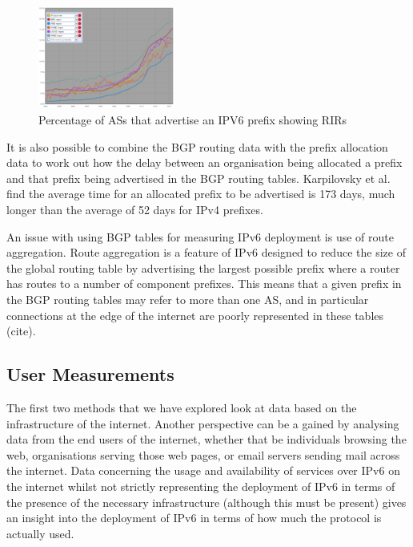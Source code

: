 \begin{figure}[htb]
\centering
\includegraphics[width=0.4\textwidth]{img/v6-bgp-rirs.png}
\caption{Percentage of ASs that advertise an IPV6 prefix showing RIRs}
\label{fig:bgp-rirs}
\end{figure}

It is also possible to combine the BGP routing data with the prefix allocation
data to work out how the delay between an organisation being allocated a prefix
and that prefix being advertised in the BGP routing tables. Karpilovsky et al.
find the average time for an allocated prefix to be advertised is 173 days, much
longer than the average of 52 days for IPv4 prefixes.

An issue with using BGP tables for measuring IPv6 deployment is use of route
aggregation. Route aggregation is a feature of IPv6 designed to reduce the size of the
global routing table by advertising the largest possible prefix where a router
has routes to a number of component prefixes. This means that a given prefix in
the BGP routing tables may refer to more than one AS, and in particular
connections at the edge of the internet are poorly represented in these
tables (cite).


\subsection{User Measurements}

The first two methods that we have explored look at data based on the
infrastructure of the internet. Another perspective can be a gained by analysing
data from the end users of the internet, whether that be individuals browsing
the web, organisations serving those web pages, or email servers sending mail
across the internet. Data concerning the usage and availability of services over
IPv6 on the internet whilst not strictly representing the deployment of IPv6 in
terms of the presence of the necessary infrastructure (although this must be
present) gives an insight into the deployment of IPv6 in terms of
how much the protocol is actually used.

